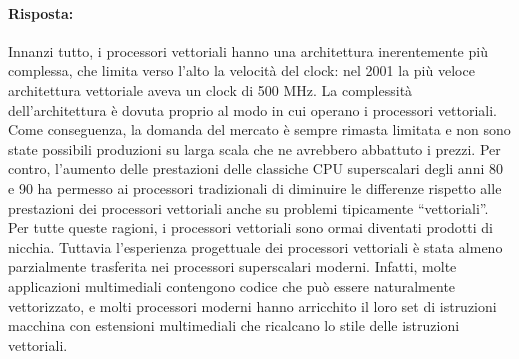 \paragraph{Risposta:} Innanzi tutto, i processori vettoriali hanno una architettura
inerentemente più complessa, che limita verso l’alto la velocità del
clock: nel 2001 la più veloce architettura vettoriale aveva un clock
di 500 MHz. La complessità dell’architettura è dovuta proprio al modo in cui
operano i processori vettoriali. Come conseguenza, la domanda del mercato è sempre rimasta
limitata e non sono state possibili produzioni su larga scala che
ne avrebbero abbattuto i prezzi. Per contro, l’aumento delle prestazioni delle classiche CPU
superscalari degli anni 80 e 90 ha permesso ai processori
tradizionali di diminuire le differenze rispetto alle prestazioni dei
processori vettoriali anche su problemi tipicamente “vettoriali”. Per tutte queste ragioni, i processori vettoriali sono ormai diventati
prodotti di nicchia. Tuttavia l’esperienza progettuale dei processori
vettoriali è stata almeno parzialmente trasferita nei processori
superscalari moderni. Infatti, molte applicazioni multimediali contengono codice che può
essere naturalmente vettorizzato, e molti processori moderni hanno
arricchito il loro set di istruzioni macchina con estensioni
multimediali che ricalcano lo stile delle istruzioni vettoriali.

